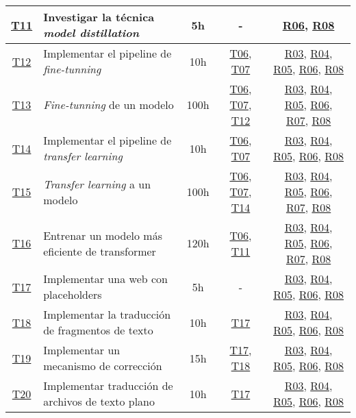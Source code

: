 \begin{landscape}
\begin{table}
\begin{tabular}{ | c | l | c | c | c | }
        \hline
        \hyperref[T11]{T11} & Investigar la técnica \textit{model distillation} & 5h & - & \hyperref[R06]{R06}, \hyperref[R08]{R08} \\
        \hline
        \hyperref[T12]{T12} & Implementar el pipeline de \textit{fine-tunning} & 10h & \hyperref[T06]{T06}, \hyperref[T07]{T07} & \hyperref[R03]{R03}, \hyperref[R04]{R04}, \hyperref[R05]{R05}, \hyperref[R06]{R06}, \hyperref[R08]{R08} \\
        \hline
        \hyperref[T13]{T13} & \textit{Fine-tunning} de un modelo & 100h & \hyperref[T06]{T06}, \hyperref[T07]{T07}, \hyperref[T12]{T12} & \hyperref[R03]{R03}, \hyperref[R04]{R04}, \hyperref[R05]{R05}, \hyperref[R06]{R06}, \hyperref[R07]{R07}, \hyperref[R08]{R08} \\
        \hline
        \hyperref[T14]{T14} & Implementar el pipeline de \textit{transfer learning} & 10h & \hyperref[T06]{T06}, \hyperref[T07]{T07} & \hyperref[R03]{R03}, \hyperref[R04]{R04}, \hyperref[R05]{R05}, \hyperref[R06]{R06}, \hyperref[R08]{R08} \\
        \hline
        \hyperref[T15]{T15} & \textit{Transfer learning} a un modelo & 100h & \hyperref[T06]{T06}, \hyperref[T07]{T07}, \hyperref[T14]{T14} & \hyperref[R03]{R03}, \hyperref[R04]{R04}, \hyperref[R05]{R05}, \hyperref[R06]{R06}, \hyperref[R07]{R07}, \hyperref[R08]{R08} \\
        \hline
        \hyperref[T16]{T16} & Entrenar un modelo más eficiente de transformer & 120h & \hyperref[T06]{T06}, \hyperref[T11]{T11} & \hyperref[R03]{R03}, \hyperref[R04]{R04}, \hyperref[R05]{R05}, \hyperref[R06]{R06}, \hyperref[R07]{R07}, \hyperref[R08]{R08} \\
        \hline
        \hyperref[T17]{T17} & Implementar una web con placeholders & 5h & - & \hyperref[R03]{R03}, \hyperref[R04]{R04}, \hyperref[R05]{R05}, \hyperref[R06]{R06}, \hyperref[R08]{R08} \\
        \hline
        \hyperref[T18]{T18} & Implementar la traducción de fragmentos de texto & 10h & \hyperref[T17]{T17} & \hyperref[R03]{R03}, \hyperref[R04]{R04}, \hyperref[R05]{R05}, \hyperref[R06]{R06}, \hyperref[R08]{R08} \\
        \hline
        \hyperref[T19]{T19} & Implementar un mecanismo de corrección & 15h & \hyperref[T17]{T17}, \hyperref[T18]{T18} & \hyperref[R03]{R03}, \hyperref[R04]{R04}, \hyperref[R05]{R05}, \hyperref[R06]{R06}, \hyperref[R08]{R08} \\
        \hline
        \hyperref[T20]{T20} & Implementar traducción de archivos de texto plano & 10h & \hyperref[T17]{T17} & \hyperref[R03]{R03}, \hyperref[R04]{R04}, \hyperref[R05]{R05}, \hyperref[R06]{R06}, \hyperref[R08]{R08} \\

\end{tabular}
\end{table}
\end{landscape}
